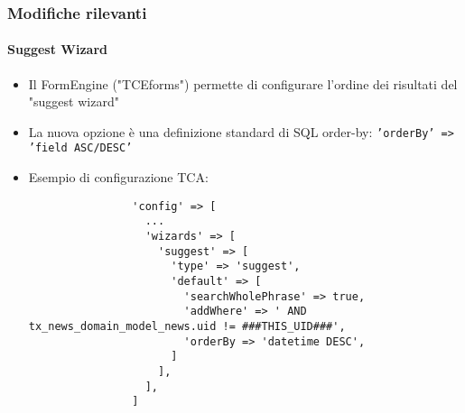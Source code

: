 \begin{frame}[fragile]
	\frametitle{Modifiche rilevanti}
	\framesubtitle{Suggest Wizard}

	\lstset{basicstyle=\tiny\ttfamily}

	\begin{itemize}
		\item Il FormEngine ("TCEforms") permette di configurare l'ordine dei risultati del "suggest wizard"
		\item La nuova opzione è una definizione standard di SQL order-by:\newline
			\small\texttt{'orderBy' => 'field ASC/DESC'}\normalsize
		\item Esempio di configurazione TCA:

			\begin{lstlisting}
				'config' => [
				  ...
				  'wizards' => [
				    'suggest' => [
				      'type' => 'suggest',
				      'default' => [
				        'searchWholePhrase' => true,
				        'addWhere' => ' AND tx_news_domain_model_news.uid != ###THIS_UID###',
				        'orderBy => 'datetime DESC',
				      ]
				    ],
				  ],
				]
			\end{lstlisting}

	\end{itemize}

\end{frame}












